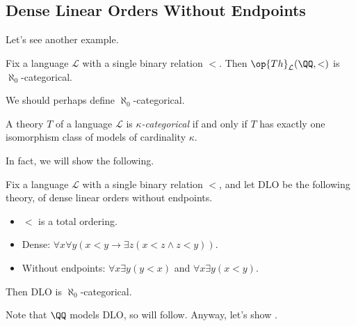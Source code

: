 \documentclass[../notes.tex]{subfiles}
\begin{document}
\subsection{Dense Linear Orders Without Endpoints}
Let's see another example.
\begin{proposition} \label{prop:q-is-aleph-0-categorical}
	Fix a language $\mathcal L$ with a single binary relation $<$. Then $\op{Th}_{\mathcal L}(\QQ,<)$ is $\aleph_0$-categorical.
\end{proposition}
We should perhaps define $\aleph_0$-categorical.
\begin{defihelper} 
	A theory $T$ of a language $\mathcal L$ is \textit{$\kappa$-categorical} if and only if $T$ has exactly one isomorphism class of models of cardinality $\kappa$.
\end{defihelper}
In fact, we will show the following.
\begin{proposition} \label{prop:countable-dlo-w-e}
	Fix a language $\mathcal L$ with a single binary relation $<$, and let $\mathrm{DLO}$ be the following theory, of dense linear orders without endpoints.
	\begin{itemize}
		\item $<$ is a total ordering.
		\item Dense: $\forall x\forall y(x<y\to\exists z(x<z\land z<y))$.
		\item Without endpoints: $\forall x\exists y(y<x)$ and $\forall x\exists y(x<y)$.
	\end{itemize}
	Then $\mathrm{DLO}$ is $\aleph_0$-categorical.
\end{proposition}
Note that $\QQ$ models $\mathrm{DLO}$, so  will follow. Anyway, let's show .
\end{document}
